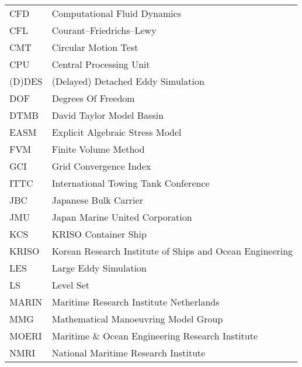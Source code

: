 \setlength{\tabcolsep}{10pt} %
\renewcommand{\arraystretch}{1.15} %

\begin{longtable}{ll}

CFD  & Computational Fluid Dynamics \\
CFL & Courant–Friedrichs–Lewy \\
CMT & Circular Motion Test \\
CPU & Central Processing Unit \\
(D)DES & (Delayed) Detached Eddy Simulation \\
DOF & Degrees Of Freedom \\
DTMB & David Taylor Model Bassin \\
EASM & Explicit Algebraic Stress Model \\
FVM & Finite Volume Method \\
GCI & Grid Convergence Index \\
ITTC & International Towing Tank Conference\\
JBC & Japanese Bulk Carrier \\
JMU & Japan Marine United Corporation\\
KCS & KRISO Container Ship\\
KRISO & Korean Research Institute of Ships and Ocean Engineering\\
LES & Large Eddy Simulation\\
LS & Level Set \\
MARIN & Maritime Research Institute Netherlands \\
MMG & Mathematical Manoeuvring Model Group \\
MOERI & Maritime \& Ocean Engineering Research Institute \\
NMRI & National Maritime Research Institute\\

\end{longtable}